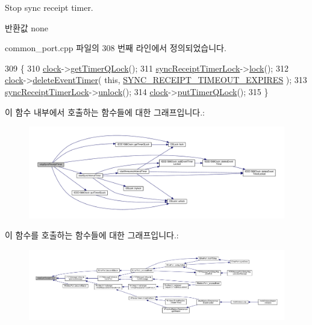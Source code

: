 Stop sync receipt timer. 

\begin{DoxyReturn}{반환값}
none 
\end{DoxyReturn}


common\+\_\+port.\+cpp 파일의 308 번째 라인에서 정의되었습니다.


\begin{DoxyCode}
309 \{
310     \hyperlink{class_common_port_aa2bc8731fa5aeb5b033feebc2b67258c}{clock}->\hyperlink{class_i_e_e_e1588_clock_a9d96aae524ab7f346d2c86dad94da7ca}{getTimerQLock}();
311     \hyperlink{class_common_port_af6298459c1a6d07a1e3538e4c5698e29}{syncReceiptTimerLock}->\hyperlink{class_o_s_lock_a9186992157d223030a002f3aded7aba2}{lock}();
312     \hyperlink{class_common_port_aa2bc8731fa5aeb5b033feebc2b67258c}{clock}->\hyperlink{class_i_e_e_e1588_clock_a19032512985731e4b13c15e47b95b548}{deleteEventTimer}( \textcolor{keyword}{this}, 
      \hyperlink{ieee1588_8hpp_a5667b805d857c6d28f83f6038a0272d3ac09ed008614f57d58759e4fd5a3c9622}{SYNC\_RECEIPT\_TIMEOUT\_EXPIRES} );
313     \hyperlink{class_common_port_af6298459c1a6d07a1e3538e4c5698e29}{syncReceiptTimerLock}->\hyperlink{class_o_s_lock_a5b965df44250112cac3cf967dc998bec}{unlock}();
314     \hyperlink{class_common_port_aa2bc8731fa5aeb5b033feebc2b67258c}{clock}->\hyperlink{class_i_e_e_e1588_clock_adbd19a2ad2cb62d2615c5a76da8193f1}{putTimerQLock}();
315 \}
\end{DoxyCode}


이 함수 내부에서 호출하는 함수들에 대한 그래프입니다.\+:
\nopagebreak
\begin{figure}[H]
\begin{center}
\leavevmode
\includegraphics[width=350pt]{class_common_port_af3b46893f10141406c791c89d3e54b8d_cgraph}
\end{center}
\end{figure}




이 함수를 호출하는 함수들에 대한 그래프입니다.\+:
\nopagebreak
\begin{figure}[H]
\begin{center}
\leavevmode
\includegraphics[width=350pt]{class_common_port_af3b46893f10141406c791c89d3e54b8d_icgraph}
\end{center}
\end{figure}


